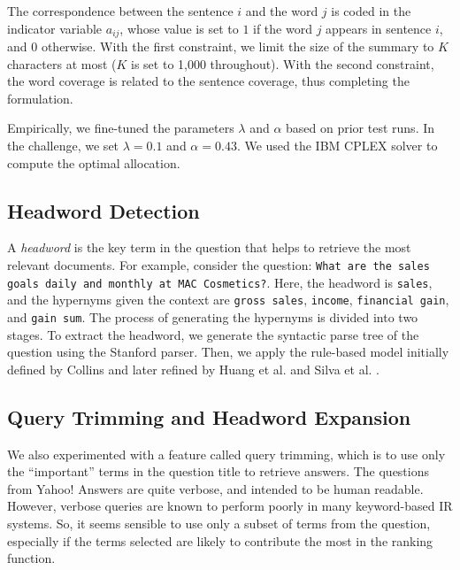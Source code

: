 \documentclass[a4paper,10pt,conference,compsocconf,final]{IEEEtran}
\begin{document}
{{{{The correspondence between the sentence $i$ and the word $j$ is coded in the
indicator variable $a_{ij}$, whose value is set to $1$ if the word $j$ appears
in sentence $i$, and $0$ otherwise.  With the first constraint, we limit the
size of the summary to $K$ characters at most ($K$ is set to 1,000 throughout).
With the second constraint, the word coverage is related to the sentence
coverage, thus completing the formulation.

Empirically, we fine-tuned the parameters $\lambda$ and $\alpha$ based on prior
test runs.  In the challenge, we set $\lambda = 0.1$ and $\alpha = 0.43$.  We
used the IBM CPLEX solver to compute the optimal allocation.




\subsection{Headword Detection}
\label{sec:head}

A {\em headword} is the key term in the question that helps
to retrieve the most relevant documents.
For example, consider the question: {\tt What are the sales
goals daily and monthly at MAC Cosmetics?}.
Here, the headword is {\tt sales}, and the hypernyms given the
context are {\tt gross sales}, {\tt income}, {\tt financial gain}, and 
{\tt gain sum}.
The process of generating the hypernyms is divided into two stages.
To extract the headword, we generate the syntactic parse tree of the
question using the Stanford parser.
Then, we apply the rule-based model initially defined by Collins
\cite{collins2003head} and later refined by Huang et al.
\cite{huang2008question} and Silva et al. \cite{silva2011symbolic}.



\subsection{Query Trimming and Headword Expansion}
\label{sec:redexp}

We also experimented with a feature called query trimming, which is to use
only the ``important'' terms in the question title to retrieve
answers.
The questions from Yahoo! Answers are quite verbose, and intended 
to be human readable.
However, verbose queries are known to perform poorly in many keyword-based
IR systems.
So, it seems sensible to use only a subset of terms from the question,
especially if the terms selected are likely to contribute the most in the
ranking function.

}}}}
\end{document}
